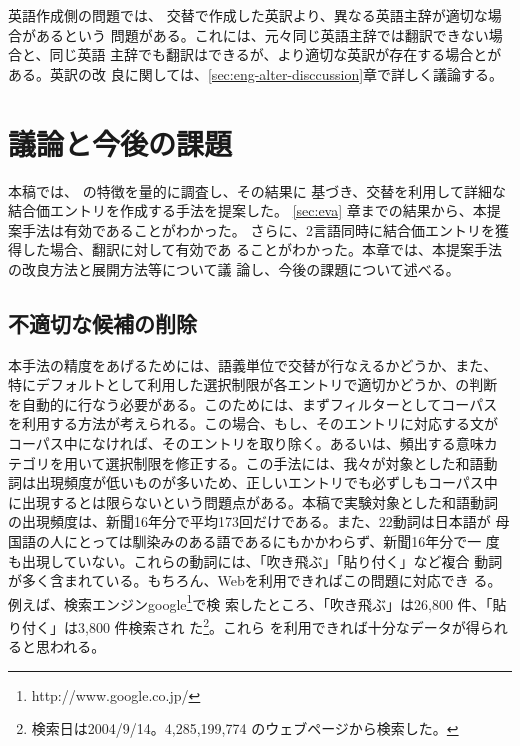 \documentclass[japanese]{jnlp}
\newcommand{\soalt}{}
\def\mpt#1{}
\renewcommand{\mpt}[1]{}
\begin{document}
\mpt{英語の主辞が異なる}

英語作成側の問題では、
交替で作成した英訳より、異なる英語主辞が適切な場合があるという
問題がある。これには、元々同じ英語主辞では翻訳できない場合と、同じ英語
主辞でも翻訳はできるが、より適切な英訳が存在する場合とがある。英訳の改
良に関しては、\ref{sec:eng-alter-disccussion}章で詳しく議論する。




\section{議論と今後の課題}\label{sec:discuss}


本稿では、\soalt{} の特徴を量的に調査し、その結果に
基づき、交替を利用して詳細な結合価エントリを作成する手法を提案した。
\ref{sec:eva} 章までの結果から、本提案手法は有効であることがわかった。
さらに、2言語同時に結合価エントリを獲得した場合、翻訳に対して有効であ
ることがわかった。本章では、本提案手法の改良方法と展開方法等について議
論し、今後の課題について述べる。

\subsection{不適切な候補の削除}\label{sec:eva-f}
 


本手法の精度をあげるためには、語義単位で交替が行なえるかどうか、また、
特にデフォルトとして利用した選択制限が各エントリで適切かどうか、の判断
を自動的に行なう必要がある。このためには、まずフィルターとしてコーパス
を利用する方法が考えられる。この場合、もし、そのエントリに対応する文が
コーパス中になければ、そのエントリを取り除く。あるいは、頻出する意味カ
テゴリを用いて選択制限を修正する。この手法には、我々が対象とした和語動
詞は出現頻度が低いものが多いため、正しいエントリでも必ずしもコーパス中
に出現するとは限らないという問題点がある。本稿で実験対象とした和語動詞
の出現頻度は、新聞16年分で平均173回だけである。また、22動詞は日本語が
母国語の人にとっては馴染みのある語であるにもかかわらず、新聞16年分で一
度も出現していない。これらの動詞には、「吹き飛ぶ」「貼り付く」など複合
動詞が多く含まれている。もちろん、Webを利用できればこの問題に対応でき
る。例えば、検索エンジンgoogle\footnote{http://www.google.co.jp/}で検
索したところ、「吹き飛ぶ」は26,800 件、「貼り付く」は3,800 件検索され
た\footnote{検索日は2004/9/14。4,285,199,774 のウェブページから検索した。}。これら
を利用できれば十分なデータが得られると思われる。

\mpt{吹き飛ぶ
10,600 (gooq)
23,800 (google),
貼り付く1,460 (goo)
3,420(google)}
\end{document}
